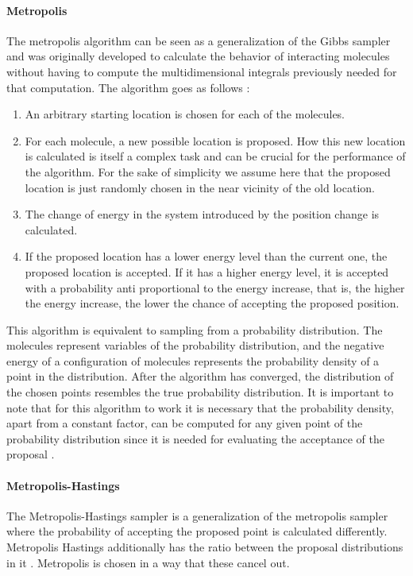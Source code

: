 \documentclass{article}
\begin{document}
\paragraph{Metropolis}
The metropolis algorithm can be seen as a generalization of the Gibbs sampler \cite{1439840954} and was originally developed to calculate the behavior of interacting molecules without having to compute the multidimensional integrals previously needed for that computation\cite{Metropolis1953}. The algorithm goes as follows : 
\begin{enumerate}
	\item An arbitrary starting location is chosen for each of the molecules. 
	\item For each molecule, a new possible location is proposed. How this new location is calculated is itself a complex task and can be crucial for the performance of the algorithm. For the sake of simplicity we assume here that the proposed location is just randomly chosen in the near vicinity of the old location.
	\item The change of energy in the system introduced by the position change is calculated.
	\item If the proposed location has a lower energy level than the current one, the proposed location is accepted. If it has a higher energy level, it is accepted with
	a probability anti proportional to the energy increase, that is, the higher the energy increase, the lower the chance of accepting the proposed position. 
\end{enumerate}
This algorithm is equivalent to sampling from a probability distribution. The molecules represent variables of the probability distribution, and the negative energy of a configuration of molecules represents the probability density of a point in the distribution. After the algorithm has converged, the distribution of the chosen points resembles the true probability distribution. It is important to note that for this algorithm to work it is necessary that the probability density, apart from a constant factor, can be computed for any given point of the probability distribution since it is needed for evaluating the acceptance of the proposal \cite{1439840954}.

\paragraph{Metropolis-Hastings}
The Metropolis-Hastings sampler is a generalization of the metropolis sampler where the probability of accepting the proposed point is calculated differently.
Metropolis Hastings additionally has the ratio between the proposal distributions in it \cite{chib1995understanding}. Metropolis is chosen in a way that these cancel out.
\end{document}
